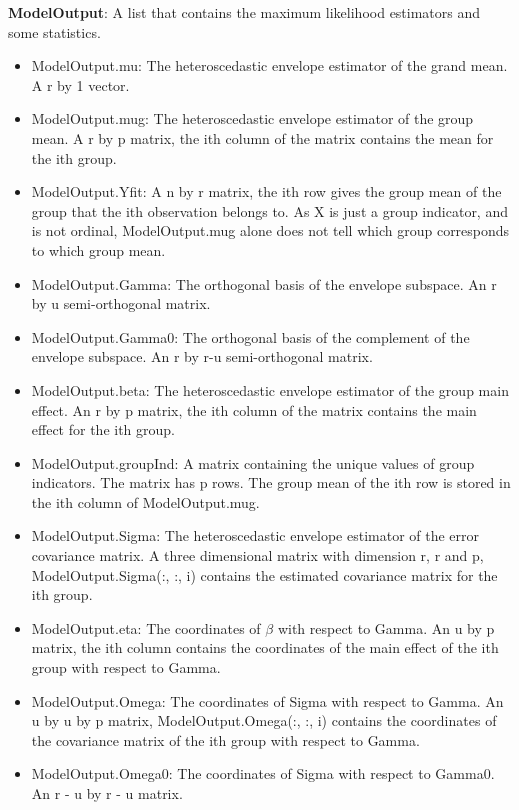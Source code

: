 \documentclass[a4paper,11pt,openany]{memoir}
\begin{document}
\begin{par}
\textbf{ModelOutput}: A list that contains the maximum likelihood estimators and some statistics.
\end{par} \vspace{1em}
\begin{itemize}
\setlength{\itemsep}{-1ex}
   \item ModelOutput.mu: The heteroscedastic envelope estimator of the grand mean. A r by 1 vector.
   \item ModelOutput.mug: The heteroscedastic envelope estimator of the group mean. A r by p matrix, the ith column of the matrix contains the mean for the ith group.
   \item ModelOutput.Yfit: A n by r matrix, the ith row gives the group mean of the group that the ith observation belongs to.  As X is just a group indicator, and is not ordinal, ModelOutput.mug alone does not tell which group corresponds to which group mean.
   \item ModelOutput.Gamma: The orthogonal basis of the envelope subspace. An r by u semi-orthogonal matrix.
   \item ModelOutput.Gamma0: The orthogonal basis of the complement of the envelope subspace.  An r by r-u semi-orthogonal matrix.
   \item ModelOutput.beta: The heteroscedastic envelope estimator of the group main effect. An r by p matrix, the ith column of the matrix contains the main effect for the ith group.
   \item ModelOutput.groupInd: A matrix containing the unique values of group indicators. The matrix has p rows.  The group mean of the ith row is stored in the ith column of ModelOutput.mug.
   \item ModelOutput.Sigma: The heteroscedastic envelope estimator of the error covariance matrix.  A three dimensional matrix with dimension r, r and p, ModelOutput.Sigma(:, :, i) contains the estimated covariance matrix for the ith group.
   \item ModelOutput.eta: The coordinates of $\beta$ with respect to Gamma. An u by p matrix, the ith column contains the coordinates of the main effect of the ith group with respect to Gamma.
   \item ModelOutput.Omega: The coordinates of Sigma with respect to Gamma. An u by u by p matrix, ModelOutput.Omega(:, :, i) contains the coordinates of the covariance matrix of the ith group with respect to Gamma.
   \item ModelOutput.Omega0: The coordinates of Sigma with respect to Gamma0. An r - u by r - u matrix.

\end{itemize}
\end{document}
